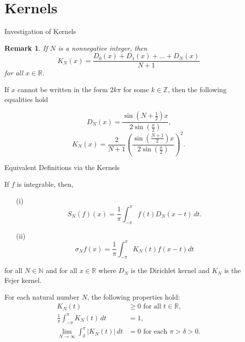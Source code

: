 \documentclass{beamer}
\newtheorem{remark}[theorem]{Remark}
\begin{document}
\section{Kernels}

\begin{frame}{Investigation of Kernels}
    \begin{remark}
         If $N$ is a nonnegative integer, then
\[
K_N(x) = \frac{D_0(x) + D_1(x) + \dots + D_N(x)}{N+1}
\]
for all $x \in \mathbb{R}$.
    \end{remark}

    \begin{theorem}
         If $x$ cannot be written in the form $2k\pi$ for some $k \in \mathbb{Z}$, then the following equalities hold

    \[
    D_N(x) = \frac{\sin\left(N + \frac{1}{2}\right)x}{2\sin(\frac{x}{2})} \text{,}
    \]
    \[
    K_N(x) = \frac{2}{N+1}\left(\frac{\sin\left(\frac{N + 1}{2}\right)x}{2\sin(\frac{x}{2})}\right)^2 \text{.}
    \]
    \end{theorem}
\end{frame}




\begin{frame}[shrink = 9]{Equivalent Definitions via the Kernels}
    \begin{theorem} If \(f\) is integrable, then,
        \begin{itemize}
            \item[(i)]
    \[
    S_N(f)(x) = \frac{1}{\pi}\int_{-\pi}^{\pi}f(t)D_N(x-t)\,dt \text{.}
    \]
            \item[(ii)] 
    \[
    \sigma_Nf(x) = \frac{1}{\pi} \int_{-\pi}^{\pi} K_N(t)f(x-t)dt
    \]
        \end{itemize}
        for all $N \in \mathbb{N}$ and for all $ x \in \mathbb{R}$ where $D_N$ is the Dirichlet kernel and $K_N$ is the Fejer kernel.
    \end{theorem}

    \begin{lemma} For each natural number $N$, the following properties hold:
    \begin{align*}
        K_N(t) &\geq 0 \text{ for all } t \in \mathbb{R}, \\
        \frac{1}{\pi}\int_{-\pi}^{\pi} K_N(t) \, dt &= 1, \\
        \lim_{N \to \infty} \int_{\delta}^{\pi} |K_N(t)| \, dt &= 0 \text{ for each $\pi > \delta > 0$.}\\ 
    \end{align*}
    \end{lemma}
\end{frame}
\end{document}
